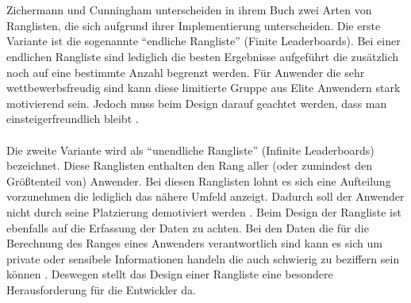 \documentclass[a4paper,12pt,twoside]{scrartcl}
\begin{document}
\\\\
Zichermann und Cunningham unterscheiden in ihrem Buch zwei Arten von Ranglisten, die sich aufgrund ihrer Implementierung unterscheiden. Die erste Variante ist die sogenannte \enquote{endliche Rangliste} (Finite Leaderboards)\cite{Zichermann2011}. Bei einer endlichen Rangliste sind lediglich die besten Ergebnisse aufgeführt die zusätzlich noch auf eine bestimmte Anzahl begrenzt werden. Für Anwender die sehr wettbewerbsfreudig sind kann diese limitierte Gruppe aus Elite Anwendern stark motivierend sein. Jedoch muss beim Design darauf geachtet werden, dass man einsteigerfreundlich bleibt \cite{Zichermann2011}. 
\\\\
Die zweite Variante wird als \enquote{unendliche Rangliste} (Infinite Leaderboards) bezeichnet. Diese Ranglisten enthalten den Rang aller (oder zumindest den Größtenteil von) Anwender. Bei diesen Ranglisten lohnt es sich eine Aufteilung vorzunehmen die lediglich das nähere Umfeld anzeigt. Dadurch soll der Anwender nicht durch seine Platzierung demotiviert werden \cite{Zichermann2011}. Beim Design der Rangliste ist ebenfalls auf die Erfassung der Daten zu achten. Bei den Daten die für die Berechnung des Ranges eines Anwenders verantwortlich sind kann es sich um private oder sensibele Informationen handeln die auch schwierig zu beziffern sein können \cite{Zichermann2011}. Deswegen stellt das Design einer Rangliste eine besondere Herausforderung für die Entwickler da.
\end{document}
